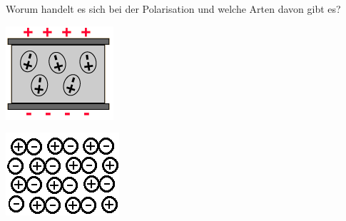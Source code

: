 \begin{lk}{Worum handelt es sich bei der Polarisation und welche Arten davon gibt es?}
\begin{center}
\begin{minipage}{0.18\textwidth}
		\end{minipage}
		\begin{minipage}{0.18\textwidth}
			\includegraphics[width=\textwidth]{pics/ES_Orientierungspolarisation.png}\\
		\end{minipage}
		\begin{minipage}{0.18\textwidth}
			\includegraphics[width=\textwidth]{pics/ES_Ionenpolarisation.png}\\
		\end{minipage}
	\end{center}
\end{lk}

